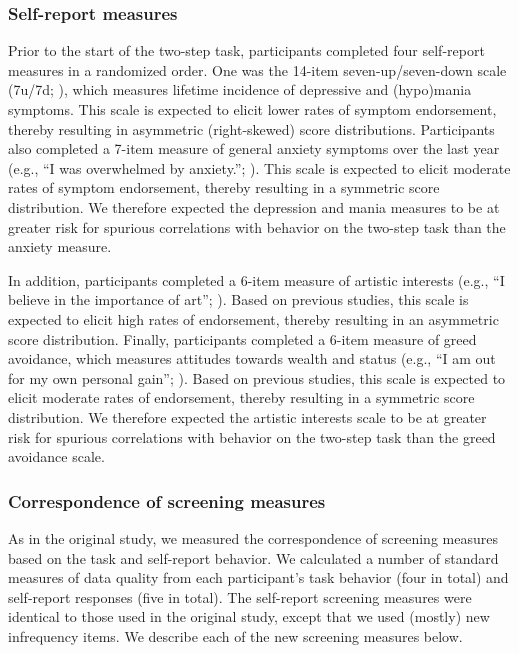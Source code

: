 \documentclass[a4paper,notitlepage,12pt]{article}
\begin{document}
\subsubsection*{Self-report measures}

Prior to the start of the two-step task, participants completed four self-report measures in a randomized order. One was the 14-item seven-up/seven-down scale (7u/7d; \cite{youngstrom_2013_susd-2}), which measures lifetime incidence of depressive and (hypo)mania symptoms. This scale is expected to elicit lower rates of symptom endorsement, thereby resulting in asymmetric (right-skewed) score distributions. Participants also completed a 7-item measure of general anxiety symptoms over the last year (e.g., ``I was overwhelmed by anxiety.''; \cite{watson2022development}). This scale is expected to elicit moderate rates of symptom endorsement, thereby resulting in a symmetric score distribution. We therefore expected the depression and mania measures to be at greater risk for spurious correlations with behavior on the two-step task than the anxiety measure. 

In addition, participants completed a 6-item measure of artistic interests (e.g., ``I believe in the importance of art''; \cite{ashton2007empirical}). Based on previous studies, this scale is expected to elicit high rates of endorsement, thereby resulting in an asymmetric score distribution. Finally, participants completed a 6-item measure of greed avoidance, which measures attitudes towards wealth and status (e.g., ``I am out for my own personal gain''; \cite{ashton2007empirical}). Based on previous studies, this scale is expected to elicit moderate rates of endorsement, thereby resulting in a symmetric score distribution. We therefore expected the artistic interests scale to be at greater risk for spurious correlations with behavior on the two-step task than the greed avoidance scale. 

\subsubsection*{Correspondence of screening measures}

As in the original study, we measured the correspondence of screening measures based on the task and self-report behavior. We calculated a number of standard measures of data quality from each participant's task behavior (four in total) and self-report responses (five in total). The self-report screening measures were identical to those used in the original study, except that we used (mostly) new infrequency items. We describe each of the new screening measures below.
\end{document}
